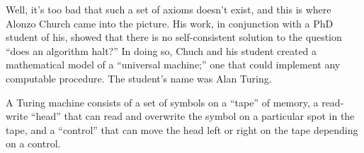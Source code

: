 Well, it's too bad that such a set of axioms doesn't exist, and this is where
Alonzo Church came into the picture. His work, in conjunction with a PhD 
student of his, showed that there is no self-consistent solution to the
question ``does an algorithm halt?'' In doing so, Chuch and his student 
created a mathematical model of a ``universal machine;'' one that could
implement any computable procedure. The student's name was Alan Turing. 

A Turing machine consists of a set of symbols on a ``tape'' of memory, a
read-write ``head'' that can read and overwrite the symbol on a particular spot
in the tape, and a ``control'' that can move the head left or right on the tape
depending on a control.

